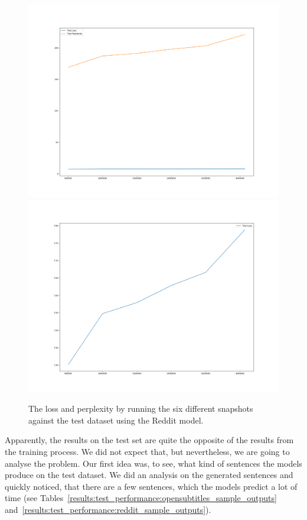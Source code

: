 \begin{figure}[H]
	\includegraphics[width=\linewidth]{img/plots/reddit/test_metrics_both.png}
	\centering
	\small
	\endminipage\hfill
	\includegraphics[width=\linewidth]{img/plots/reddit/test_metrics_loss.png}
	\centering
	\small
	\endminipage\hfill
	\caption{The loss and perplexity by running the six different snapshots against the test dataset using the Reddit model.}
	\label{result:test_performance:reddit}
\end{figure}

Apparently, the results on the test set are quite the opposite of the results from the training process. We did not expect that, but nevertheless, we are going to analyse the problem. Our first idea was, to see, what kind of sentences the models produce on the test dataset. We did an analysis on the generated sentences and quickly noticed, that there are a few sentences, which the models predict a lot of time (see Tables~\ref{results:test_performance:opensubtitles_sample_outputs} and~\ref{results:test_performance:reddit_sample_outputs}).

